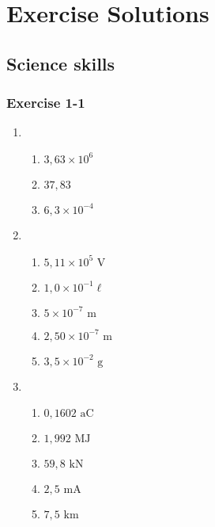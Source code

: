 \chapter{Exercise Solutions}
\section{Science skills}

\subsection{Exercise 1-1} 
\begin{multicols}{3}
\begin{enumerate}[noitemsep, label=\textbf{\arabic*}. ] 
\item %
  \begin{enumerate}[itemsep=5pt, label=\textbf{(\alph*)} ] 
    \item $3,63 \times 10^6$
    \item $37,83$
    \item $6,3 \times 10^{−4}$
    \end{enumerate}
\item %
    \begin{enumerate}[itemsep=5pt, label=\textbf{(\alph*)} ] 
    \item $5,11 \times 10^{5} \text{ V}$
    \item $1,0 \times 10^{-1} \ell$
    \item $5 \times 10^{-7} \text{ m}$
    \item $2,50 \times 10^{-7} \text{ m}$
    \item $3,5 \times 10^{-2} \text{ g}$
    \end{enumerate}
 \item %
    \begin{enumerate}[itemsep=5pt, label=\textbf{(\alph*)} ] 
    \item $0,1602 \text{ aC}$
    \item $1,992 \text{ MJ}$
    \item $59,8 \text{ kN}$
    \item $2,5 \text{ mA}$
    \item $7,5 \text{ km}$
    \end{enumerate}
\end{enumerate}
\end{multicols}
